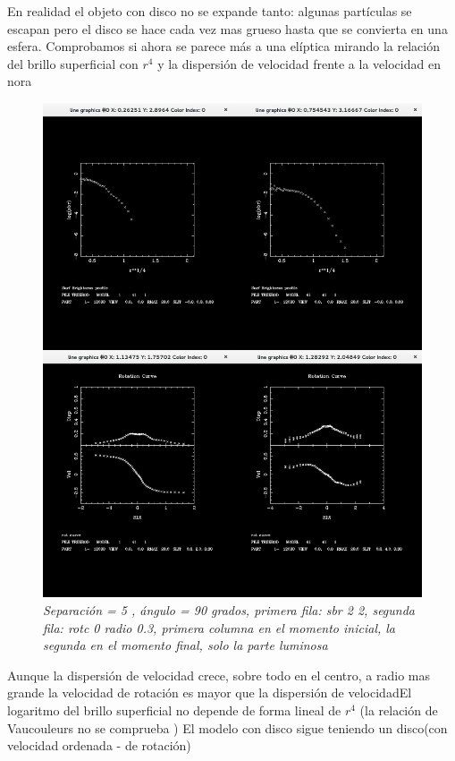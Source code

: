 \documentclass[12pt]{article} %
\renewcommand{\=}[1]{\stackrel{#1}{=}} %
\theoremstyle{definition}
\theoremstyle{remark}
\begin{document}
En realidad el objeto con disco no se expande tanto: algunas partículas se escapan pero el disco se hace cada vez mas grueso hasta que se convierta  en  una esfera. Comprobamos si ahora se parece más a una elíptica mirando la relación del brillo superficial con $r^4$ y la dispersión de velocidad frente a la velocidad en nora

\begin{figure}[!ht]
 \centering
 \includegraphics[scale=0.3]{noraellip.png}
 \caption{\emph{ Separación = 5 , ángulo = 90 grados, primera fila: sbr 2 2, segunda fila: rotc 0 radio 0.3, primera columna en el momento inicial, la segunda en el momento final, solo la parte luminosa  }}
\end{figure}

Aunque la dispersión de velocidad crece, sobre todo en el centro, a radio mas grande la velocidad de rotación es mayor que la dispersión de velocidadEl logaritmo del brillo superficial no depende de forma lineal de $r^4$ (la relación de  Vaucouleurs no se comprueba )
El modelo con disco sigue teniendo un disco(con velocidad ordenada - de rotación)
\end{document}

